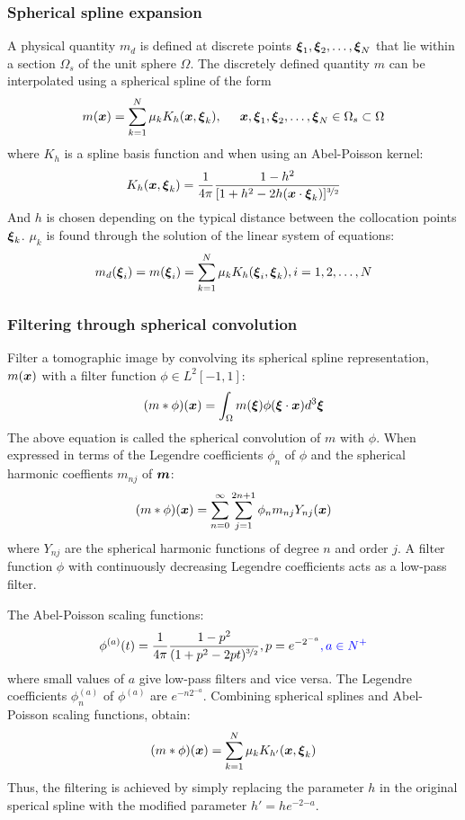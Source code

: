 \subsubsection{Spherical spline expansion}
A physical quantity $m_d$ is defined at discrete points $\boldsymbol{\xi}_1,\boldsymbol{\xi}_2,\ldots,\boldsymbol{\xi}_N$
that lie within a section $\Omega_s$ of the unit sphere $\Omega$.
The discretely defined quantity $m$ can be interpolated using a spherical spline of the form
\[ m(\boldsymbol{x})=\sum_{k=1}^N\mu_kK_h(\boldsymbol{x},\boldsymbol{\xi}_k), \hspace{5mm} \boldsymbol{x},\boldsymbol{\xi}_1,\boldsymbol{\xi}_2,\ldots,\boldsymbol{\xi}_N\in\Omega_s\subset\Omega  \]
where $K_h$ is a spline basis function and when using an Abel-Poisson kernel:
\[ K_h(\boldsymbol{x},\boldsymbol{\xi}_k)=\frac{1}{4\pi}\frac{1-h^2}{[1+h^2-2h(\boldsymbol{x}\cdot\boldsymbol{\xi}_k)]^{\nicefrac{3}{2}}} \]
And $h$ is chosen depending on the typical distance between the collocation points $\boldsymbol{\xi}_k$.
$\mu_k$ is found through the solution of the linear system of equations:
\[ m_d(\boldsymbol{\xi}_i)=m(\boldsymbol{\xi}_i)=\sum_{k=1}^N\mu_kK_h(\boldsymbol{\xi}_i,\boldsymbol{\xi}_k),i=1,2,\ldots,N \]

\subsubsection{Filtering through spherical convolution}
Filter a tomographic image by convolving its spherical spline representation,
$m(\boldsymbol{x})$ with a filter function $\phi\in L^2[-1,1]$:
\[ (m*\phi)(\boldsymbol{x})=\int_\Omega m(\boldsymbol{\xi})\phi(\boldsymbol{\xi}\cdot\boldsymbol{x})d^3\boldsymbol{\xi} \]
The above equation is called the spherical convolution of $m$ with $\phi$.
When expressed in terms of the Legendre coefficients $\phi_n$ of $\phi$
and the spherical harmonic coeffients $m_{nj}$ of $\boldsymbol{m}$:
\[ (m*\phi)(\boldsymbol{x})=\sum_{n=0}^\infty\sum_{j=1}^{2n+1}\phi_nm_{nj}Y_{nj}(\boldsymbol{x}) \]
where $Y_{nj}$ are the spherical harmonic functions of degree $n$ and order $j$.
A filter function $\phi$ with continuously decreasing Legendre coefficients
acts as a low-pass filter.

The Abel-Poisson scaling functions:
\[ \phi^{(a)}(t)=\frac{1}{4\pi}\frac{1-p^2}{(1+p^2-2pt)^{\nicefrac{3}{2}}},p=e^{-2^{-a}}{\color{blue},a\in N^+} \]
where small values of $a$ give low-pass filters and vice versa.
The Legendre coefficients $\phi_n^{(a)}$ of $\phi^{(a)}$ are $e^{-n2^{-a}}$.
Combining spherical splines and Abel-Poisson scaling functions, obtain:
\[ (m*\phi)(\boldsymbol{x})=\sum_{k=1}^N\mu_kK_{h'}(\boldsymbol{x},\boldsymbol{\xi}_k)\]
Thus, the filtering is achieved by simply replacing the parameter $h$
in the original sperical spline with the modified parameter $h'=he^{-2{-a}}$.

